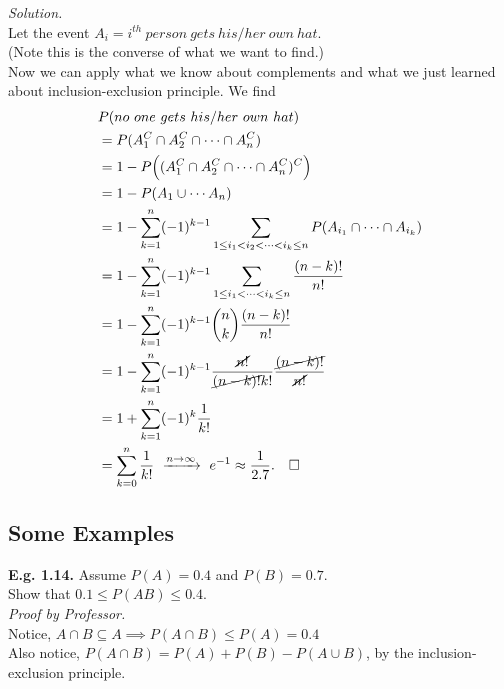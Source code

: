 \documentclass[12pt]{book}
\begin{document}
\noindent \textit{Solution.} \\
Let the event $A_{i} = i^{th}~person~gets~his/her~own~hat$. \\
(Note this is the converse of what we want to find.) \\

\noindent Now we can apply what we know about complements and what we just learned about inclusion-exclusion principle. We find 
\begin{align*}
&P(no~one~gets~his/her~own~hat)\\
&=P(A_{1}^{C} \cap A_{2}^{C} \cap \cdots \cap A_{n}^{C})\\
&=1- P\Big((A_{1}^{C} \cap A_{2}^{C} \cap \cdots\cap A_{n}^{C})^{C}\Big)\\
&= 1- P(A_{1}\cup \cdots A_{n}) \\
&= 1-\sum\limits_{k=1}^{n} (-1)^{k-1} \sum\limits_{1\leq i_{1} < i_{2} <\cdots <i_{k} \leq n }  P(A_{i_{1}} \cap \cdots \cap A_{i_{k}})\\
&= 1-\sum\limits_{k=1}^{n} (-1)^{k-1} \sum\limits_{1\leq i_{1} <\cdots <i_{k} \leq n }  \frac{(n-k)!}{n!}\\
&= 1- \sum\limits_{k=1}^{n} (-1)^{k-1} {n\choose k} \frac{(n-k)!}{n!}\\
&= 1-\sum\limits_{k=1}^{n} (-1)^{k-1} \frac{\cancel{n!}}{\cancel{(n-k)!}k!} \frac{\cancel{(n-k)!}}{\cancel{n!}} \\
&= 1+ \sum\limits_{k=1}^{n} (-1)^{k} \frac{1}{k!}\\
&= \sum\limits_{k=0}^{n} \frac{1}{k!} ~\xrightarrow{n\to \infty}~ e^{-1} \approx \frac{1}{2.7}.~~~\square 
\end{align*}
\newpage








\subsection{Some Examples}
\noindent \textbf{E.g. 1.14. } Assume $P(A)=0.4$ and $P(B)=0.7$. \\Show that $0.1\leq P(AB) \leq 0.4$.\\

\noindent\textit{Proof by Professor. }\\
Notice, $A\cap B \subseteq A \implies P(A\cap B) \leq P(A)=0.4$\\
Also notice, $P(A\cap B)=P(A)+P(B)-P(A\cup B)$, by the inclusion-exclusion principle. \\
\end{document}
